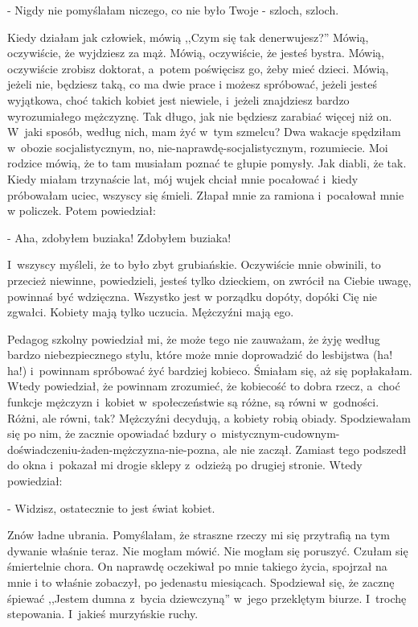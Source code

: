 \documentclass[oneside,polish,12pt,sfheadings]{mwbk}
\begin{document}
- Nigdy nie pomyślałam niczego, co nie było Twoje - szloch, szloch. 

Kiedy działam jak człowiek, mówią ,,Czym się tak denerwujesz?''
Mówią, oczywiście, że wyjdziesz za mąż. Mówią, oczywiście, że jesteś
bystra. Mówią, oczywiście zrobisz doktorat, a~potem poświęcisz go,
żeby mieć dzieci. Mówią, jeżeli nie, będziesz taką, co ma dwie prace
i możesz spróbować, jeżeli jesteś wyjątkowa, choć takich kobiet jest
niewiele, i~jeżeli znajdziesz bardzo wyrozumiałego mężczyznę. Tak
długo, jak nie będziesz zarabiać więcej niż on. W~jaki sposób, według
nich, mam żyć w~tym szmelcu? Dwa wakacje spędziłam w~obozie socjalistycznym,
no, nie-naprawdę-socjalistycznym, rozumiecie. Moi rodzice mówią, że
to tam musiałam poznać te głupie pomysły. Jak diabli, że tak. Kiedy
miałam trzynaście lat, mój wujek chciał mnie pocałować i~kiedy próbowałam
uciec, wszyscy się śmieli. Złapał mnie za ramiona i~pocałował mnie
w policzek. Potem powiedział: 

- Aha, zdobyłem buziaka! Zdobyłem buziaka!

I~wszyscy myśleli, że to było zbyt grubiańskie. Oczywiście mnie
obwinili, to przecież niewinne, powiedzieli, jesteś tylko dzieckiem,
on zwrócił na Ciebie uwagę, powinnaś być wdzięczna. Wszystko jest
w porządku dopóty, dopóki Cię nie zgwałci. Kobiety mają tylko uczucia.
Mężczyźni mają ego.

Pedagog szkolny powiedział mi, że może tego nie zauważam, że żyję
według bardzo niebezpiecznego stylu, które może mnie doprowadzić do
lesbijstwa (ha! ha!) i~powinnam spróbować żyć bardziej kobieco. Śmiałam
się, aż się popłakałam. Wtedy powiedział, że powinnam zrozumieć, że
kobiecość to dobra rzecz, a~choć funkcje mężczyzn i~kobiet w~społeczeństwie
są różne, są równi w~godności. Różni, ale równi, tak? Mężczyźni decydują,
a kobiety robią obiady. Spodziewałam się po nim, że zacznie opowiadać
bzdury o~mistycznym-cudownym-doświadczeniu-żaden-mężczyzna-nie-pozna,
ale nie zaczął. Zamiast tego podszedł do okna i~pokazał mi drogie
sklepy z~odzieżą po drugiej stronie. Wtedy powiedział: 

- Widzisz, ostatecznie to jest świat kobiet. 

Znów ładne ubrania. Pomyślałam,
że straszne rzeczy mi się przytrafią na tym dywanie właśnie teraz.
Nie mogłam mówić. Nie mogłam się poruszyć. Czułam się śmiertelnie
chora. On naprawdę oczekiwał po mnie takiego życia, spojrzał na mnie
i to właśnie zobaczył, po jedenastu miesiącach. Spodziewał się, że
zacznę śpiewać ,,Jestem dumna z~bycia dziewczyną'' w~jego przeklętym
biurze. I~trochę stepowania. I~jakieś murzyńskie ruchy.
\end{document}
